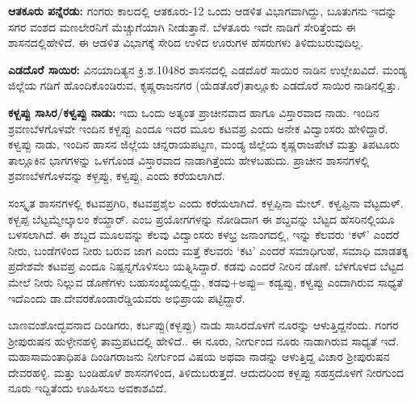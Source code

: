 \vskip 2pt

\textbf{ಆತಕೂರು ಪನ್ನೆರಡು:} ಗಂಗರು ಕಾಲದಲ್ಲಿ ಆತಕೂರು-12 ಒಂದು ಆಡಳಿತ ವಿಭಾಗವಾಗಿದ್ದು, ಬೂತುಗನು ಇದನ್ನು ಸಗರ ವಂಶದ ಮಣಲೇರನಿಗೆ ಮೆಚ್ಚುಗೆಯಾಗಿ ನೀಡುತ್ತಾನೆ. ಬೆಳತೂರು ಇದೇ ನಾಡಿಗೆ ಸೇರಿತ್ತೆಂದು ಈ ಶಾಸನದಲ್ಲಿ\break ಹೇಳಿದೆ. ಈ ಆಡಳಿತ ವಿಭಾಗಕ್ಕೆ ಸೇರಿದ ಉಳಿದ ಊರುಗಳ ಹೆಸರುಗಳು ತಿಳಿದುಬರುವುದಿಲ್ಲ.

\vskip 2pt

\textbf{ಎಡದೊರೆ ಸಾಯಿರ:} ವಿನಯಾದಿತ್ಯನ ಕ್ರಿ.ಶ.1048ರ ಶಾಸನದಲ್ಲಿ ಎಡದೊರೆ ಸಾಯಿರ ನಾಡಿನ ಉಲ್ಲೇಖವಿದೆ. ಮಂಡ್ಯ ಜಿಲ್ಲೆಯ ಗಡಿಗೆ ಹೊಂದಿಕೊಂಡಿರುವ, ಕೃಷ್ಣರಾಜನಗರ (ಯೆಡತೊರೆ)ತಾಲ್ಲೂಕು ಎಡದೊರೆ ಸಾಯಿರ ನಾಡಿನಲ್ಲಿತ್ತು.

\vskip 2pt

\textbf{ಕಳ್ಬಪ್ಪು ಸಾಸಿರ/ಕಳ್ವಪ್ಪು ನಾಡು:} ಇದು ಒಂದು ಅತ್ಯಂತ ಪ್ರಾಚೀನವಾದ ಹಾಗೂ ವಿಸ್ತಾರವಾದ ನಾಡು. ಇಂದಿನ ಶ್ರವಣಬೆಳಗೊಳವೇ ಇಂದಿನ ಕಳ್ಬಪ್ಪು ಎಂದೂ ಇದರ ಮೂಲ ಕಟವಪ್ರ ಎಂದು ಅನೇಕ ವಿದ್ವಾಂಸರು ಹೇಳಿದ್ದಾರೆ. ಕಳ್ವಪ್ಪು ನಾಡು, ಇಂದಿನ ಹಾಸನ ಜಿಲ್ಲೆಯ ಚನ್ನರಾಯಪಟ್ಟಣ, ಮಂಡ್ಯ ಜಿಲ್ಲೆಯ ಕೃಷ್ಣರಾಜಪೇಟೆ ಮತ್ತು ತಿಪಟೂರು ತಾಲ್ಲೂಕಿನ ಭಾಗಗಳನ್ನು ಒಳಗೊಂಡ ವಿಸ್ತಾರವಾದ ನಾಡಾಗಿತ್ತೆಂದು ಹೇಳಬಹುದು. ಪ್ರಾಚೀನ ಶಾಸನಗಳಲ್ಲಿ ಶ್ರವಣಬೆಳಗೊಳವನ್ನು ಕಳ್ಬಪ್ಪು, ಕಳ್ವಪ್ಪು, ಎಂದು ಕರೆಯಲಾಗಿದೆ.

\vskip 2pt

ಸಂಸ್ಕೃತ ಶಾಸನಗಳಲ್ಲಿ ಕಟವಪ್ರಗಿರಿ, ಕಟವಪ್ರಶೈಲ ಎಂದು ಕರೆಯಲಾಗಿದೆ. ಕಳ್ಬಪ್ಪಿನಾ ಮೇಲ್. ಕಳ್ವಪ್ಪಿನಾ ವೆಟ್ಟದುಳ್. ಕಳ್ಬಪ್ಪ ಬೆಟ್ಟಮ್ಮೇಲ್ಕಾಲಂ ಕೆಯ್ದಾರ್. ಎಂಬ ಪ್ರಯೋಗಗಳನ್ನು ನೋಡಿದಾಗ ಈ ಶಬ್ದವನ್ನು ಬೆಟ್ಟದ ಹೆಸರಿ\-ನಲ್ಲಿಯೂ ಬಳಸಲಾಗಿದೆ. ಈ ಶಬ್ದದ ಮೂಲವನ್ನು ಕೆಲವು ವಿದ್ವಾಂಸರು ಕಳಭ್ರ ಜನಾಂಗದಲ್ಲಿ, ಇನ್ನು ಕೆಲವರು ‘ಕಳ್​’ ಎಂದರೆ ನೀರು, ಬಂಡೆಗಳಿಂದ ನೀರು ಬರುವ ಜಾಗ ಎಂದು ಮತ್ತೆ ಕೆಲವರು ‘ಕಟ’ ಎಂದರೆ ಸಮಾಧಿಗುಹೆ, ಸಮಾಧಿ ಮಾಡತಕ್ಕ ಪ್ರದೇಶವೇ ಕಟವಪ್ರ ಎಂದೂ ನಿಷ್ಪನ್ನಗೊಳಿಸಲು ಯತ್ನಿಸಿದ್ದಾರೆ. ಕಡವು ಎಂದರೆ ನೀರಿನ ಡೊಣೆ. ಬೆಳಗೊಳದ ಬೆಟ್ಟದ ಮೇಲೆ ನೀರು ನಿಲ್ಲುವ ಡೊಣೆಗಳು ಬಹುಸಂಖ್ಯೆಯಲ್ಲಿದ್ದು, ಕಡವು+ಅಪ್ಪು= ಕಡ್ವಪ್ಪು, ಕಳ್ವಪ್ಪು ಎಂದಾಗಿರುವ ಸಾಧ್ಯತೆ ಇದೆ\break ಎಂದು ಡಾ.ದೇವರಕೊಂಡಾರೆಡ್ಡಿಯವರು ಅಭಿಪ್ರಾಯ ಪಟ್ಟಿದ್ದಾರೆ.

ಬಾಣವಂಶೋದ್ಭವನಾದ ದಿಂಡಿಗರು, ಕರ್ಬಪ್ಪು(ಕಳ್ಬಪ್ಪು) ನಾಡು ಸಾಸಿರದೊಳಗೆ ನೂರನ್ನು ಆಳುತ್ತಿದ್ದನೆಂದು. ಗಂಗರ ಶ‍್ರೀಪುರುಷನ ಹುಳ್ಳೇನಹಳ್ಳಿ ತಾಮ್ರಪಟದಲ್ಲಿ ಹೇಳಿದೆ.. ಈ ನೂರು, ನೀರ್ಗುಂದ ನೂರು ನಾಡಾಗಿರುವ ಸಾಧ್ಯತೆ ಇದೆ. ಮಹಾಸಾಮಂತಾಧಿಪತಿ ದಿಂಡಿಗರಾಜನು ನೀರ್ಗುಂದ ವಿಷಯ ಅಥವಾ ನಾಡನ್ನು ಆಳುತ್ತಿದ್ದ ವಿಚಾರ ಶ‍್ರೀಪುರುಷನ ದೇವರಹಳ್ಳಿ. ಮತ್ತು ಬಂಡಿಹೊಳೆ ಶಾಸನಗಳಿಂದ, ತಿಳಿದುಬರುತ್ತದೆ. ಆದುದರಿಂದ ಕಳ್ಬಪ್ಪು ಸಹಸ್ರದೊಳಗೆ ನೀರಗುಂದ ನೂರು ಇದ್ದಿತೆಂದು ಊಹಿಸಲು ಅವಕಾಶವಿದೆ.

